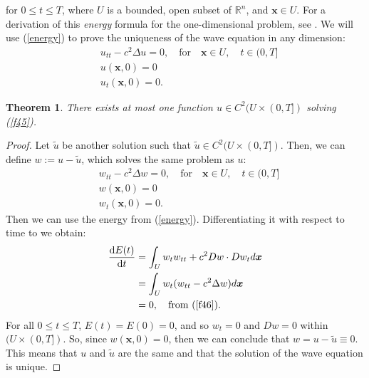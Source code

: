 \documentclass[a4paper, 12pt]{article}
\numberwithin{equation}{section}
\begin{document}
for $0 \le t \le T$, where $U$ is a bounded, open subset of $\mathbb{R}^n$, and
$\boldsymbol{x} \in U$. For a derivation of this \emph{energy} formula for the
one-dimensional problem, see \cite[Ch. 3.6.4]{Kev}. We will use
(\ref{energy}) to prove the uniqueness of the wave equation in any dimension:
\begin{equation} \label{f45}
    \begin{aligned}
        &u_{tt}-c^2\Delta u =0, \quad \textrm{for} \quad \boldsymbol{x} \in U, \quad t \in (0,T]\\
        &u(\boldsymbol{x}, 0)=0\\
        &u_t(\boldsymbol{x}, 0)=0.
    \end{aligned}
\end{equation}

\newtheorem*{theorem}{Theorem}
\begin{theorem}
    There exists at most one function $u \in C^2(U \times (0,T])$ solving
    (\ref{f45}).
\end{theorem}

\begin{proof}
    Let $\tilde{u}$ be another solution such that $\tilde{u} \in C^2(U \times
    (0,T])$. Then, we can define $w:=u-\tilde{u}$, which solves the same problem
    as $u$:
    \begin{equation} \label{f46}
        \begin{aligned}
            &w_{tt}-c^2\Delta w =0, \quad \textrm{for} \quad \boldsymbol{x} \in U, \quad t \in (0,T]\\
            &w(\boldsymbol{x}, 0)=0\\
            &w_t(\boldsymbol{x}, 0)=0.
        \end{aligned}
    \end{equation}
    Then we can use the energy from (\ref{energy}). Differentiating it with respect
    to time to we obtain:
    \begin{equation*}
        \begin{aligned}
            \diff{E(t)}{t}&=\int_U w_t w_{tt} + c^2 Dw \cdot Dw_t d\boldsymbol{x}\\
            &=\int_U w_t (w_{tt}-c^2 \Delta w)d\boldsymbol{x}\\
            &=0, \quad \textrm{from (\ref{f46})}.
        \end{aligned}
    \end{equation*}
    For all $0 \le t \le T$, $E(t)=E(0)=0$, and so
    $w_t=0$ and $Dw=0$ within $(U \times (0, T])$. So, since
    $w(\boldsymbol{x}, 0)=0$, then we can conclude that $w=u-\tilde{u}\equiv 0$.
    This means that $u$ and $\tilde{u}$ are the same and that the solution of
    the wave equation is unique.
\renewcommand\qedsymbol{q.e.d.}
\end{proof}
\end{document}
